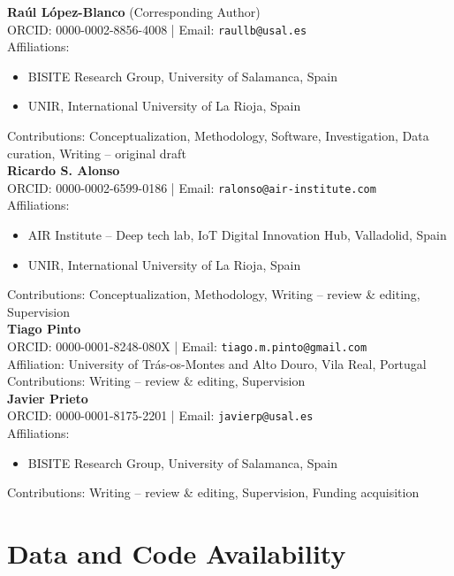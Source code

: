 \documentclass[a4paper,fleqn]{cas-dc}
\begin{document}
\textbf{Ra\'{u}l L\'{o}pez-Blanco} (Corresponding Author)\\
ORCID: 0000-0002-8856-4008 | Email: \texttt{raullb@usal.es}\\
Affiliations:
\begin{itemize}
  \item BISITE Research Group, University of Salamanca, Spain
  \item UNIR, International University of La Rioja, Spain
\end{itemize}
Contributions: Conceptualization, Methodology, Software, Investigation, Data curation, Writing -- original draft\\

\textbf{Ricardo S. Alonso}\\
ORCID: 0000-0002-6599-0186 | Email: \texttt{ralonso@air-institute.com}\\
Affiliations:
\begin{itemize}
  \item AIR Institute -- Deep tech lab, IoT Digital Innovation Hub, Valladolid, Spain
  \item UNIR, International University of La Rioja, Spain
\end{itemize}
Contributions: Conceptualization, Methodology, Writing -- review \& editing, Supervision\\

\textbf{Tiago Pinto}\\
ORCID: 0000-0001-8248-080X | Email: \texttt{tiago.m.pinto@gmail.com}\\
Affiliation: University of Tr\'{a}s-os-Montes and Alto Douro, Vila Real, Portugal\\
Contributions: Writing -- review \& editing, Supervision\\

\textbf{Javier Prieto}\\
ORCID: 0000-0001-8175-2201 | Email: \texttt{javierp@usal.es}\\
Affiliations:
\begin{itemize}
  \item BISITE Research Group, University of Salamanca, Spain
\end{itemize}
Contributions: Writing -- review \& editing, Supervision, Funding acquisition\\

\section*{Data and Code Availability}
\end{document}
